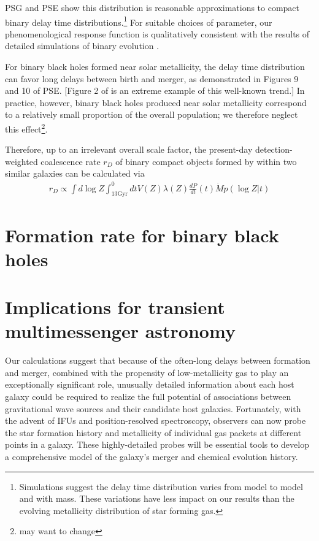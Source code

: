\documentclass[nofootinbib,twocolumn,prd]{emulateapj}
\newcommand\unit[1]{\text{#1}}
\newcommand\abbrvPSgrb{PSG}
\newcommand\abbrvPSellipticals{PSE}
\begin{document}
\abbrvPSgrb{} and \abbrvPSellipticals{} show this distribution is reasonable approximations to compact binary delay
time distributions.\footnote{Simulations suggest the delay time distribution varies from model to model and with mass.
  These variations have less impact on our results than the evolving metallicity distribution of star forming gas.}
%
For suitable choices of parameter, our phenomenological response function is qualitatively consistent with the results of detailed simulations of binary
evolution  \citep{2010ApJ...715L.138B,popsyn-LowMetallicityImpact2c-StarTrackRevised-2014,popsyn-LowMetallicityImpact2b-StarTrackRevised-2013,popsyn-LowMetallicityImpact2-StarTrackRevised-2012}.


For binary black holes formed near solar metallicity, the delay time distribution can favor long delays between birth
and merger, as demonstrated in Figures 9 and 10 of \abbrvPSellipticals{}.  [Figure 2 of  \cite{2016arXiv160508783L} is
  an extreme example of this well-known trend.]  In practice, however, binary black holes produced near solar
metallicity correspond to a relatively small proportion of the overall population; we therefore neglect this
effect\footnote{may want to change}.


Therefore, up to an irrelevant overall scale factor, the  present-day detection-weighted coalescence rate $r_D$  of binary compact objects formed by within two similar
galaxies  can be calculated via
\begin{eqnarray}
 r_D \propto  \int d\log Z  \int _{13 \unit{Gyr}}^0dt  V(Z) \lambda(Z) \frac{dP}{dt}(t) \dot{M} p(\log Z|t)
\end{eqnarray}


\section{Formation rate for binary black holes}
\label{sec:results:BBH}



\section{Implications for transient multimessenger astronomy}

Our calculations suggest that because of the often-long delays between formation and merger, combined with the
propensity of low-metallicity gas to play an exceptionally significant role, unusually detailed information about each host galaxy could be required to realize the full
potential of  associations between gravitational wave sources and their candidate host galaxies.
%
Fortunately,  with the advent of
IFUs and position-resolved spectroscopy, observers can now probe the star formation history and metallicity of
individual gas packets at different points in a galaxy.  
%
These highly-detailed probes will be essential tools to develop a comprehensive model of the galaxy's merger and
chemical evolution history.    
\end{document}
